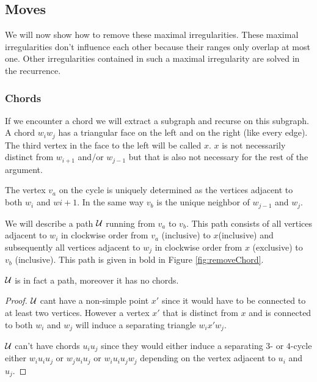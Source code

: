 \subsection{Moves}
\newcommand{\U}{\scr U}
We will now show how to remove these maximal irregularities. These maximal irregularities don't influence each other because their ranges only overlap at most one. Other irregularities contained in such a maximal irregularity are solved in the recurrence. 

\subsubsection{Chords}
If we encounter a chord we will extract a subgraph and recurse on this subgraph. A chord $w_iw_j$ has a triangular face on the left and on the right (like every edge). The third vertex in the face to the left will be called $x$. $x$ is not necessarily distinct from $w_{i+1}$ and/or $w_{j-1}$ but that is also not necessary for the rest of the argument. 

The vertex $v_a$ on the cycle is uniquely determined as the vertices adjacent to both $w_i$ and $w{i+1}$. In the same way $v_b$ is the unique neighbor of $w_{j-1}$ and $w_j$.

We will describe a path $\mathcal{U}$ running from $v_a$ to $v_b$. This path consists of all vertices adjacent to $w_i$ in clockwise order from $v_a$ (inclusive) to $x$(inclusive) and subsequently all vertices adjacent to $w_j$ in clockwise order from $x$ (exclusive) to $v_b$ (inclusive). This path is given in bold in Figure \ref{fig:removeChord}. 

\begin{lemma}
$\U$ is in fact a path, moreover it has no chords.
\end{lemma}
\begin{proof}
$\U$ cant have a non-simple point $x'$ since it would have to be connected to at least two vertices. However a vertex $x'$ that is distinct from $x$ and is connected to both $w_i$ and $w_j$ will induce a separating triangle $w_i x' w_j$. 

$\mathcal{U}$ can't have chords $u_i u_j$ since they would either induce a separating $3$- or $4$-cycle either $w_i u_i u_j$ or $w_j u_i u_j$ or $w_i u_i u_j w_j$ depending on the vertex adjacent to $u_i$ and $u_j$.
\end{proof}


